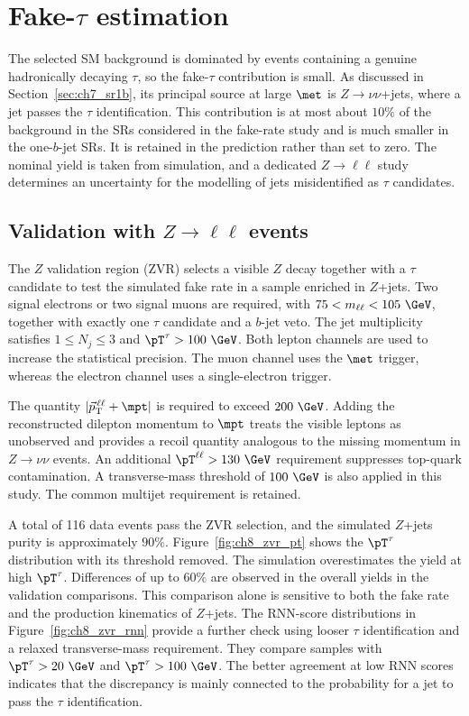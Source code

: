 
\clearpage
\section[Fake-tau estimation]{Fake-$\tau$ estimation}
\label{sec:ch8_fake}

The selected SM background is dominated by events containing a genuine hadronically decaying $\tau$, so the fake-$\tau$ contribution is small.
As discussed in Section~\ref{sec:ch7_sr1b}, its principal source at large $\met$ is $Z\to\nu\nu$+jets, where a jet passes the $\tau$ identification.
This contribution is at most about $10\%$ of the background in the SRs considered in the fake-rate study and is much smaller in the one-$b$-jet SRs.
It is retained in the prediction rather than set to zero.
The nominal yield is taken from simulation, and a dedicated $Z\to\ell\ell$ study determines an uncertainty for the modelling of jets misidentified as $\tau$ candidates.

\subsection[Validation with Z dilepton events]{Validation with $Z\to\ell\ell$ events}
\label{subsec:ch8_zvr}

The $Z$ validation region (ZVR) selects a visible $Z$ decay together with a $\tau$ candidate to test the simulated fake rate in a sample enriched in $Z$+jets.
Two signal electrons or two signal muons are required, with $75<m_{\ell\ell}<105~\GeV$, together with exactly one $\tau$ candidate and a $b$-jet veto.
The jet multiplicity satisfies $1\leq N_j\leq3$ and $\pT^\tau>100~\GeV$.
Both lepton channels are used to increase the statistical precision.
The muon channel uses the $\met$ trigger, whereas the electron channel uses a single-electron trigger.

The quantity $|\vec p_{\mathrm{T}}^{\,\ell\ell}+\mpt|$ is required to exceed $200~\GeV$.
Adding the reconstructed dilepton momentum to $\mpt$ treats the visible leptons as unobserved and provides a recoil quantity analogous to the missing momentum in $Z\to\nu\nu$ events.
An additional $\pT^{\ell\ell}>130~\GeV$ requirement suppresses top-quark contamination.
A transverse-mass threshold of $100~\GeV$ is also applied in this study.
The common multijet requirement is retained.

A total of 116 data events pass the ZVR selection, and the simulated $Z$+jets purity is approximately $90\%$.
Figure~\ref{fig:ch8_zvr_pt} shows the $\pT^\tau$ distribution with its threshold removed.
The simulation overestimates the yield at high $\pT^\tau$.
Differences of up to $60\%$ are observed in the overall yields in the validation comparisons.
This comparison alone is sensitive to both the fake rate and the production kinematics of $Z$+jets.
The RNN-score distributions in Figure~\ref{fig:ch8_zvr_rnn} provide a further check using looser $\tau$ identification and a relaxed transverse-mass requirement.
They compare samples with $\pT^\tau>20~\GeV$ and $\pT^\tau>100~\GeV$.
The better agreement at low RNN scores indicates that the discrepancy is mainly connected to the probability for a jet to pass the $\tau$ identification.

